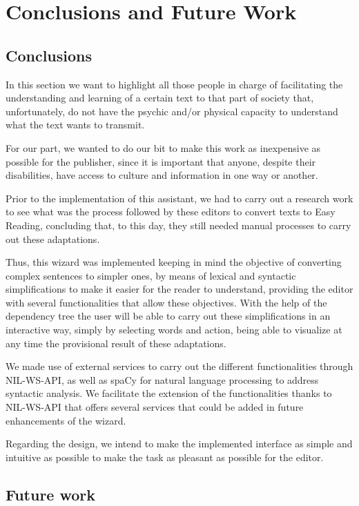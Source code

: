 \chapter{Conclusions and Future Work}
\label{cap:conclusions}

\section{Conclusions}

In this section we want to highlight all those people in charge of facilitating the understanding and learning of a certain text to that part of society that, unfortunately, do not have the psychic and/or physical capacity to understand what the text wants to transmit.

For our part, we wanted to do our bit to make this work as inexpensive as possible for the publisher, since it is important that anyone, despite their disabilities, have access to culture and information in one way or another.

Prior to the implementation of this assistant, we had to carry out a research work to see what was the process followed by these editors to convert texts to Easy Reading, concluding that, to this day, they still needed manual processes to carry out these adaptations.

Thus, this wizard was implemented keeping in mind the objective of converting complex sentences to simpler ones, by means of lexical and syntactic simplifications to make it easier for the reader to understand, providing the editor with several functionalities that allow these objectives. With the help of the dependency tree the user will be able to carry out these simplifications in an interactive way, simply by selecting words and action, being able to visualize at any time the provisional result of these adaptations.

We made use of external services to carry out the different functionalities through NIL-WS-API, as well as spaCy for natural language processing to address syntactic analysis. We facilitate the extension of the functionalities thanks to NIL-WS-API that offers several services that could be added in future enhancements of the wizard.

Regarding the design, we intend to make the implemented interface as simple and intuitive as possible to make the task as pleasant as possible for the editor.

\section{Future work}

